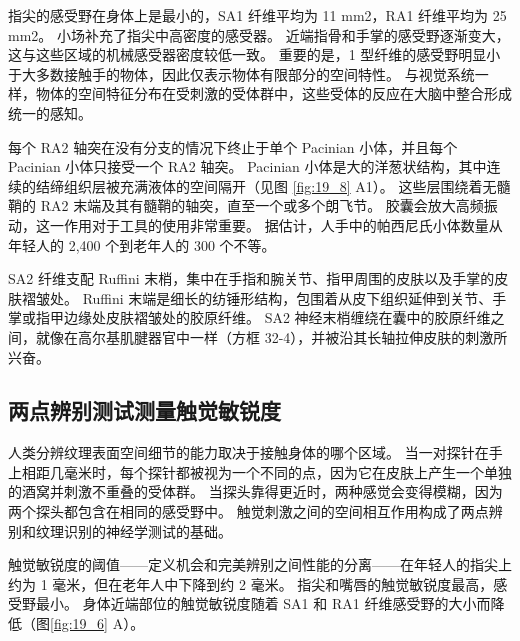 指尖的感受野在身体上是最小的，SA1 纤维平均为 11 mm2，RA1 纤维平均为 25 mm2。 
小场补充了指尖中高密度的感受器。 
近端指骨和手掌的感受野逐渐变大，这与这些区域的机械感受器密度较低一致。 
重要的是，1 型纤维的感受野明显小于大多数接触手的物体，因此仅表示物体有限部分的空间特性。 
与视觉系统一样，物体的空间特征分布在受刺激的受体群中，这些受体的反应在大脑中整合形成统一的感知。


每个 RA2 轴突在没有分支的情况下终止于单个 Pacinian 小体，并且每个 Pacinian 小体只接受一个 RA2 轴突。 
Pacinian 小体是大的洋葱状结构，其中连续的结缔组织层被充满液体的空间隔开（见图 \ref{fig:19_8} A1）。 
这些层围绕着无髓鞘的 RA2 末端及其有髓鞘的轴突，直至一个或多个朗飞节。 
胶囊会放大高频振动，这一作用对于工具的使用非常重要。 
据估计，人手中的帕西尼氏小体数量从年轻人的 2,400 个到老年人的 300 个不等。


SA2 纤维支配 Ruffini 末梢，集中在手指和腕关节、指甲周围的皮肤以及手掌的皮肤褶皱处。 
Ruffini 末端是细长的纺锤形结构，包围着从皮下组织延伸到关节、手掌或指甲边缘处皮肤褶皱处的胶原纤维。 
SA2 神经末梢缠绕在囊中的胶原纤维之间，就像在高尔基肌腱器官中一样（方框 32-4），并被沿其长轴拉伸皮肤的刺激所兴奋。


\subsection{两点辨别测试测量触觉敏锐度}
人类分辨纹理表面空间细节的能力取决于接触身体的哪个区域。 
当一对探针在手上相距几毫米时，每个探针都被视为一个不同的点，因为它在皮肤上产生一个单独的酒窝并刺激不重叠的受体群。 
当探头靠得更近时，两种感觉会变得模糊，因为两个探头都包含在相同的感受野中。 
触觉刺激之间的空间相互作用构成了两点辨别和纹理识别的神经学测试的基础。


触觉敏锐度的阈值——定义机会和完美辨别之间性能的分离——在年轻人的指尖上约为 1 毫米，但在老年人中下降到约 2 毫米。 
指尖和嘴唇的触觉敏锐度最高，感受野最小。 
身体近端部位的触觉敏锐度随着 SA1 和 RA1 纤维感受野的大小而降低（图\ref{fig:19_6} A）。

